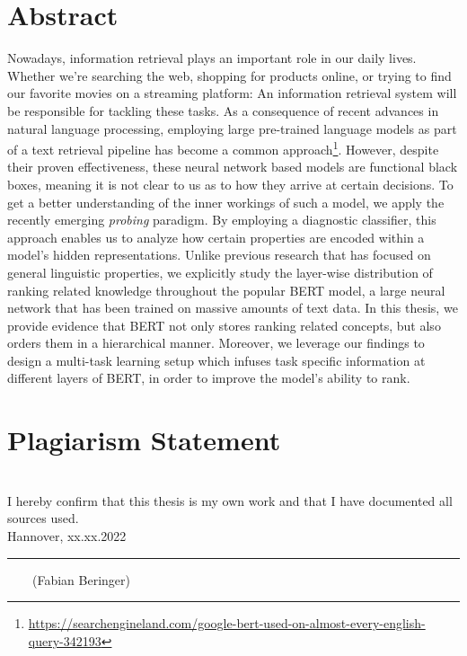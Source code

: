 \documentclass[headsepline]{scrreprt}
\newcommand{\handindate}{xx.xx.2022}
\newcommand{\ti}[1]{\textit{#1}}
\begin{document}


\chapter*{Abstract}
Nowadays, information retrieval plays an important role in our daily lives. Whether we're searching the web, shopping for products online, or trying to find our favorite movies on a streaming platform: An information retrieval system will be responsible for tackling these tasks. As a consequence of recent advances in natural language processing, employing large pre-trained language models as part of a text retrieval pipeline has become a common approach\footnote{\url{https://searchengineland.com/google-bert-used-on-almost-every-english-query-342193}}. However, despite their proven effectiveness, these neural network based models are functional black boxes, meaning it is not clear to us as to how they arrive at certain decisions. To get a better understanding of the inner workings of such a model, we apply the recently emerging \ti{probing} paradigm. By employing a diagnostic classifier, this approach enables us to analyze how certain properties are encoded within a model's hidden representations. Unlike previous research that has focused on general linguistic properties, we explicitly study the layer-wise distribution of ranking related knowledge throughout the popular BERT model, a large neural network that has been trained on massive amounts of text data. In this thesis, we provide evidence that BERT not only stores ranking related concepts, but also orders them in a hierarchical manner. Moreover, we leverage our findings to design a multi-task learning setup which infuses task specific information at different layers of BERT, in order to improve the model's ability to rank.

\tableofcontents










\chapter*{Plagiarism Statement}
\vfill
\mbox{} \\
{\large I hereby confirm that this thesis is my own work and that I have documented all sources used.}
\newline
\mbox{} \\
Hannover, \handindate \\
\vspace{4cm}
\hrule
\vspace{0.5cm}
$\qquad$(Fabian Beringer)

\listoffigures
{}
\listoftables
{}
\clearpage
{}
{}

\end{document}
